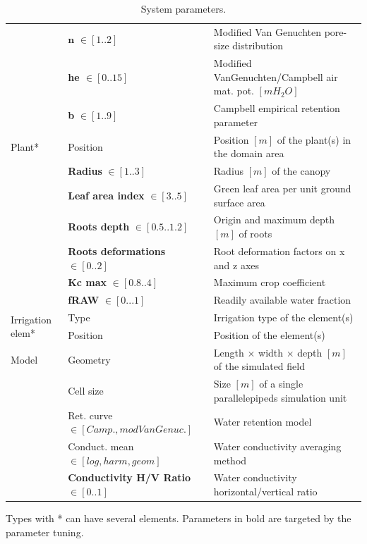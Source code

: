 \begin{table}[H]
\begin{tabular}{p{1.2cm}p{5cm}p{7.5cm}}
		& $\mathbf{n}$ $\in [1..2]$ & Modified Van Genuchten pore-size distribution\\
		& \textbf{he $\in [0..15]$} & Modified VanGenuchten/Campbell air mat. pot. $[m H_2O]$ \\ 
		& \textbf{b} $\in [1..9]$ & Campbell empirical retention parameter\\ 
		\hline%
		Plant* & Position & Position $[m]$ of the plant(s) in the domain area\\
		& \textbf{Radius} $\in [1..3]$ & Radius $[m]$ of the canopy \\
		& \textbf{Leaf area index} $\in [3..5]$ & Green leaf area per unit ground surface area\\ %
		& \textbf{Roots depth} $\in [0.5..1.2]$ &  Origin and maximum depth $[m]$ of roots\\
		& \textbf{Roots deformations} $\in [0..2]$ &  Root deformation factors on x and z axes\\ 
		& \textbf{Kc max} $\in [0.8..4]$ &  Maximum crop coefficient\\
		& \textbf{fRAW} $\in [0...1]$ & Readily available water fraction\\
		\hline%
		\multirow{2}{1cm}{Irrigation elem*} & Type & Irrigation type of the element(s) \\
		& Position & Position of the element(s)\\
		\hline%
		Model & Geometry  & Length $\times$ width $\times$ depth $[m]$ of the simulated field\\
		& Cell size  &  Size $[m]$ of a single parallelepipeds simulation unit\\%
		& Ret. curve $\in [Camp., mod Van Genuc.]$ & Water retention model\\ 
	    & Conduct. mean $\in [log, harm, geom]$ &  Water conductivity averaging method \\ %
		& \textbf{Conductivity H/V Ratio} $\in [0..1]$  &  Water conductivity horizontal/vertical ratio \\
		\bottomrule
	\end{tabular}%
	\begin{tablenotes}
      \scriptsize
      \item Types with * can have several elements. Parameters in bold are targeted by the parameter tuning.
    \end{tablenotes}
	\caption{System parameters.}
	\label{tab:parameter}%
\end{table}%

